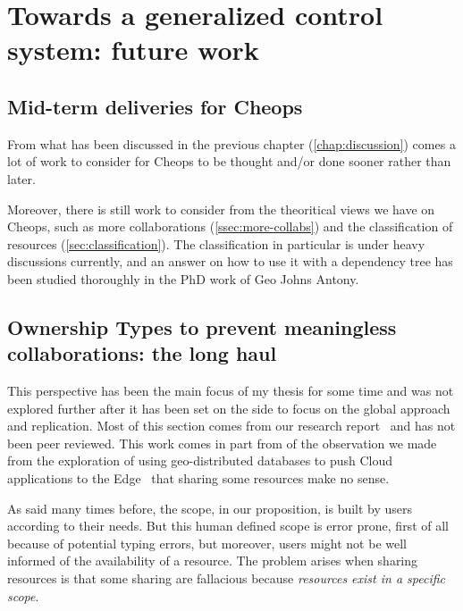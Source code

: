 



\chapter{Towards a generalized control system: future work} %
\label{chap:future-work}

\section{Mid-term deliveries for Cheops}

From what has been discussed in the previous chapter
(\autoref{chap:discussion}) comes a lot of work to consider for Cheops
to be thought and/or done sooner rather than later.

Moreover, there is still work to consider from the theoritical views
we have on Cheops, such as more collaborations
(\autoref{ssec:more-collabs}) and the classification of resources
(\autoref{sec:classification}).
%
The classification in particular is under heavy discussions currently,
and an answer on how to use it with a dependency tree has been studied
thoroughly in the PhD work of Geo Johns Antony.


\section{Ownership Types to prevent meaningless collaborations: the long haul} %


This perspective has been the main focus of my thesis for some time
and was not explored further after it has been set on the side to
focus on the global approach and replication.
%
Most of this section comes from our research report~\cite{CDLR+20} and
has not been peer reviewed.
%
This work comes in part from of the observation we made from the
exploration of using geo-distributed databases to push Cloud
applications to the Edge~\cite{DCL18} that sharing some resources make
no sense.


As said many times before, the scope, in our proposition, is built by
users according to their needs.
%
But this human defined scope is error prone, first of all because of
potential typing errors, but moreover, users might not be well
informed of the availability of a resource.
%
The problem arises when sharing resources is that some sharing are
fallacious because \emph{resources exist in a specific scope}.
%

